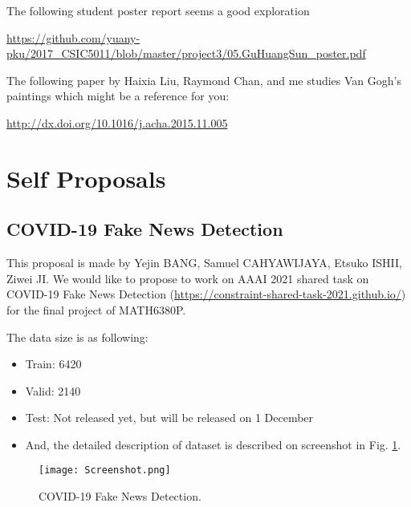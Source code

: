 \documentclass[11pt]{article}
\begin{document}
The following student poster report seems a good exploration

\url{https://github.com/yuany-pku/2017_CSIC5011/blob/master/project3/05.GuHuangSun_poster.pdf}

The following paper by Haixia Liu, Raymond Chan, and me studies Van Gogh's paintings which might be a reference for you:

\url{http://dx.doi.org/10.1016/j.acha.2015.11.005}


\section{Self Proposals}

\subsection{COVID-19 Fake News Detection}

This proposal is made by Yejin BANG, Samuel CAHYAWIJAYA, Etsuko ISHII, Ziwei JI. We would like to propose to work on AAAI 2021 shared task on COVID-19 Fake News Detection (\url{https://constraint-shared-task-2021.github.io/}) for the final project of MATH6380P. 

The data size is as following:
\begin{itemize}
\item Train: 6420
\item Valid: 2140
\item Test: Not released yet, but will be released on 1 December
\item And, the detailed description of dataset is described on screenshot in Fig. \ref{fig:screenshot}.
\end{itemize}

\begin{figure}
\begin{centering}
\texttt{[image: Screenshot.png]}  
\caption{COVID-19 Fake News Detection.}
\label{fig:screenshot}
\end{centering}
\end{figure}
\end{document}
